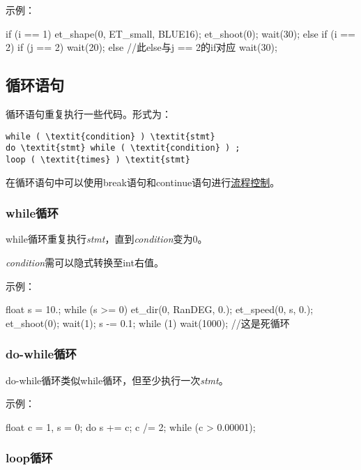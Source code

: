 \documentclass[UTF8]{ctexart}
\begin{document}
示例：

\begin{MUAvbt}
if (i == 1) {
	et_shape(0, ET_small, BLUE16);
	et_shoot(0);
	wait(30);
}
else if (i == 2)
	if (j == 2)
		wait(20);
	else			//此else与j == 2的if对应
		wait(30);
\end{MUAvbt}

\subsection{循环语句}

循环语句重复执行一些代码。形式为：

\begin{Verbatim}[frame=single, rulecolor=\color{magenta}, commandchars=\\\{\}]
while ( \textit{condition} ) \textit{stmt}
do \textit{stmt} while ( \textit{condition} ) ;
loop ( \textit{times} ) \textit{stmt}
\end{Verbatim}

在循环语句中可以使用break语句和continue语句进行\hyperref[break]{流程控制}。

\subsubsection{while循环}

while循环重复执行\textit{stmt}，直到\textit{condition}变为0。

\textit{condition}需可以隐式转换至int右值。

示例：

\begin{MUAvbt}
float s = 10.;
while (s >= 0) {
	et_dir(0, RanDEG, 0.);
	et_speed(0, s, 0.);
	et_shoot(0);
	wait(1);
	s -= 0.1;
}
while (1)
	wait(1000);			//这是死循环
\end{MUAvbt}

\subsubsection{do-while循环}

do-while循环类似while循环，但至少执行一次\textit{stmt}。

示例：

\begin{MUAvbt}
float c = 1, s = 0;
do {
	s += c;
	c /= 2;
} while (c > 0.00001);
\end{MUAvbt}

\subsubsection{loop循环}
\end{document}
